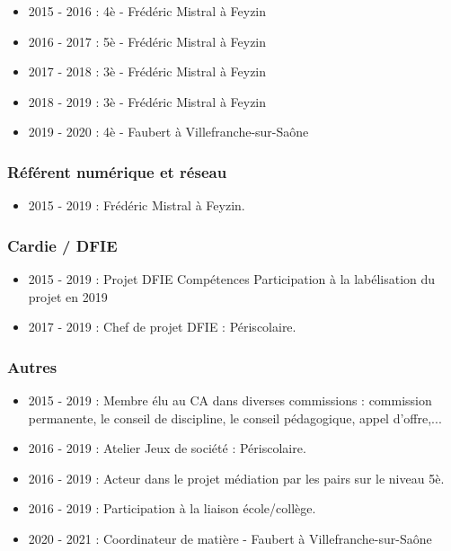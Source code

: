 \documentclass[11pt]{article}
\begin{document}
\begin{itemize}
  \item 2015 - 2016 : 4è - Frédéric Mistral à Feyzin
  \item 2016 - 2017 : 5è - Frédéric Mistral à Feyzin
  \item 2017 - 2018 : 3è - Frédéric Mistral à Feyzin
  \item 2018 - 2019 : 3è - Frédéric Mistral à Feyzin
  \item 2019 - 2020 : 4è - Faubert à Villefranche-sur-Saône
\end{itemize}

\subsubsection{Référent numérique et réseau}

\begin{itemize}
  \item 2015 - 2019 : Frédéric Mistral à Feyzin.
\end{itemize}

\subsubsection{Cardie / DFIE}

\begin{itemize}
  \item 2015 - 2019 : Projet DFIE Compétences
    Participation à la labélisation du projet en 2019
  \item 2017 - 2019 : Chef de projet DFIE : Périscolaire.
\end{itemize}

\subsubsection{Autres}

\begin{itemize}
  \item 2015 - 2019 : Membre élu au CA dans diverses commissions : commission permanente, le conseil de discipline, le conseil pédagogique, appel d'offre,...
  \item 2016 - 2019 : Atelier Jeux de société : Périscolaire.
  \item 2016 - 2019 : Acteur dans le projet médiation par les pairs sur le niveau 5è.
  \item 2016 - 2019 : Participation à la liaison école/collège.
  \item 2020 - 2021 : Coordinateur de matière - Faubert à Villefranche-sur-Saône
\end{itemize}
\end{document}
